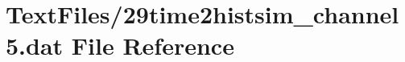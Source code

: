 \hypertarget{29time2histsim__channel5_8dat}{}\section{Text\+Files/29time2histsim\+\_\+channel5.dat File Reference}
\label{29time2histsim__channel5_8dat}
